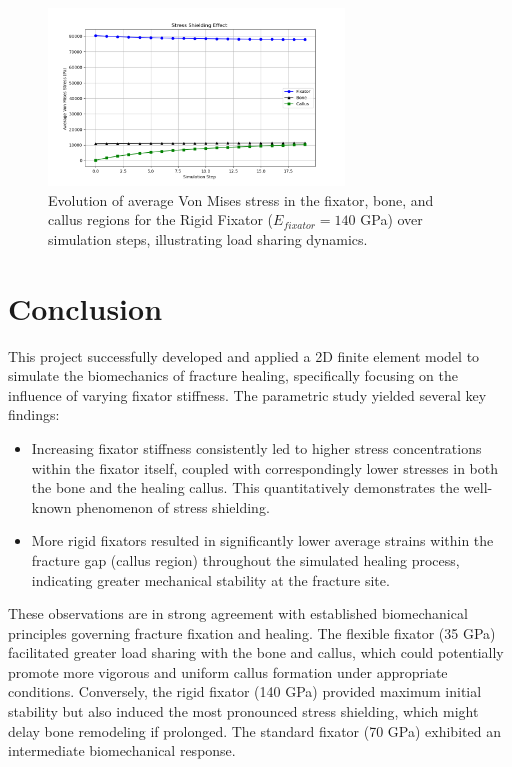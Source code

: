 \documentclass{article}
\begin{document}
\begin{figure}[htbp]
  \centering
  \includegraphics[width=0.7\textwidth]{../output_advanced/Rigid/stress_shielding.png}
  \caption{Evolution of average Von Mises stress in the fixator, bone, and callus regions for the Rigid Fixator ($E_{fixator} = 140$ GPa) over simulation steps, illustrating load sharing dynamics.}
  \label{fig:rigid_stress_shielding}
\end{figure}

\clearpage

\section{Conclusion}
This project successfully developed and applied a 2D finite element model to simulate the biomechanics of fracture healing, specifically focusing on the influence of varying fixator stiffness. The parametric study yielded several key findings:
\begin{itemize}
  \item Increasing fixator stiffness consistently led to higher stress concentrations within the fixator itself, coupled with correspondingly lower stresses in both the bone and the healing callus. This quantitatively demonstrates the well-known phenomenon of stress shielding.
  \item More rigid fixators resulted in significantly lower average strains within the fracture gap (callus region) throughout the simulated healing process, indicating greater mechanical stability at the fracture site.
\end{itemize}
These observations are in strong agreement with established biomechanical principles governing fracture fixation and healing. The flexible fixator (35 GPa) facilitated greater load sharing with the bone and callus, which could potentially promote more vigorous and uniform callus formation under appropriate conditions. Conversely, the rigid fixator (140 GPa) provided maximum initial stability but also induced the most pronounced stress shielding, which might delay bone remodeling if prolonged. The standard fixator (70 GPa) exhibited an intermediate biomechanical response.
\end{document}

